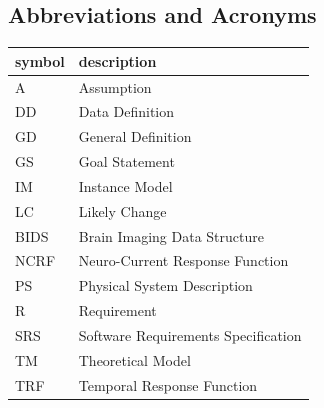 \documentclass[12pt]{article}
\begin{document}
\subsection{Abbreviations and Acronyms}

\renewcommand{\arraystretch}{1.2}
\begin{tabular}{l l}
  \toprule
  \textbf{symbol} & \textbf{description}\\
  \midrule
  A & Assumption\\
  DD & Data Definition\\
  GD & General Definition\\
  GS & Goal Statement\\
  IM & Instance Model\\
  LC & Likely Change\\
  BIDS & Brain Imaging Data Structure\\
  NCRF & Neuro-Current Response Function\\
  PS & Physical System Description\\
  R & Requirement\\
  SRS & Software Requirements Specification\\
  TM & Theoretical Model\\
  TRF & Temporal Response Function\\
  \bottomrule
\end{tabular}\\




\end{document}

